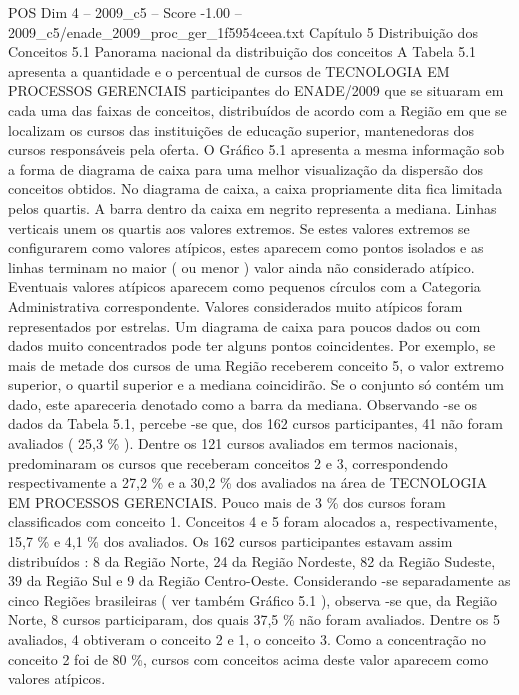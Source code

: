 \begin{textsample}{POS Dim 4 – 2009\_c5 – Score -1.00 – 2009\_c5/enade\_2009\_proc\_ger\_1f5954ceea.txt}  \label{ex:f4_pos_268}
Capítulo 5 Distribuição dos Conceitos 5.1 Panorama nacional da distribuição dos conceitos A Tabela 5.1 apresenta a quantidade e o percentual de cursos de TECNOLOGIA EM PROCESSOS GERENCIAIS participantes do ENADE/2009 que se situaram em cada uma das faixas de conceitos, distribuídos de acordo com a Região em que se localizam os cursos das instituições de educação superior, mantenedoras dos cursos responsáveis pela oferta.
O Gráfico 5.1 apresenta a mesma informação sob a forma de diagrama de caixa para uma melhor visualização da dispersão dos conceitos obtidos.
No diagrama de caixa, a caixa propriamente dita fica limitada pelos quartis.
A barra dentro da caixa em negrito representa a mediana.
Linhas verticais unem os quartis aos valores extremos.
Se estes valores extremos se configurarem como valores atípicos, estes aparecem como pontos isolados e as linhas terminam no maior ( ou menor ) valor ainda não considerado atípico.
Eventuais valores atípicos aparecem como pequenos círculos com a Categoria Administrativa correspondente.
Valores considerados muito atípicos foram representados por estrelas.
Um diagrama de caixa para poucos dados ou com dados muito concentrados pode ter alguns pontos coincidentes.
Por exemplo, se mais de metade dos cursos de uma Região receberem conceito 5, o valor extremo superior, o quartil superior e a mediana coincidirão.
Se o conjunto só contém um dado, este apareceria denotado como a barra da mediana.
Observando -se os dados da Tabela 5.1, percebe -se que, dos 162 cursos participantes, 41 não foram avaliados ( 25,3 \% ).
Dentre os 121 cursos avaliados em termos nacionais, predominaram os cursos que receberam conceitos 2 e 3, correspondendo respectivamente a 27,2 \% e a 30,2 \% dos avaliados na área de TECNOLOGIA EM PROCESSOS GERENCIAIS.
Pouco mais de 3 \% dos cursos foram classificados com conceito 1.
Conceitos 4 e 5 foram alocados a, respectivamente, 15,7 \% e 4,1 \% dos avaliados.
Os 162 cursos participantes estavam assim distribuídos : 8 da Região Norte, 24 da Região Nordeste, 82 da Região Sudeste, 39 da Região Sul e 9 da Região Centro-Oeste.
Considerando -se separadamente as cinco Regiões brasileiras ( ver também Gráfico 5.1 ), observa -se que, da Região Norte, 8 cursos participaram, dos quais 37,5 \% não foram avaliados.
Dentre os 5 avaliados, 4 obtiveram o conceito 2 e 1, o conceito 3.
Como a concentração no conceito 2 foi de 80 \%, cursos com conceitos acima deste valor aparecem como valores atípicos.

\end{textsample}
